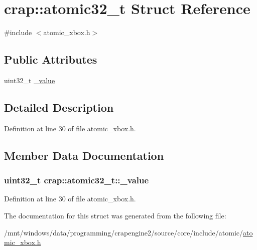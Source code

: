 \hypertarget{structcrap_1_1atomic32__t}{\section{crap\+:\+:atomic32\+\_\+t Struct Reference}
\label{structcrap_1_1atomic32__t}
}


{\ttfamily \#include $<$atomic\+\_\+xbox.\+h$>$}

\subsection*{Public Attributes}
\begin{DoxyCompactItemize}
\item 
uint32\+\_\+t \hyperlink{structcrap_1_1atomic32__t_abc3fe1e160a1f6e1337d38e326d3f3f1}{\+\_\+value}
\end{DoxyCompactItemize}


\subsection{Detailed Description}


Definition at line 30 of file atomic\+\_\+xbox.\+h.



\subsection{Member Data Documentation}
\hypertarget{structcrap_1_1atomic32__t_abc3fe1e160a1f6e1337d38e326d3f3f1}{
\subsubsection[{\+\_\+value}]{\setlength{\rightskip}{0pt plus 5cm}uint32\+\_\+t crap\+::atomic32\+\_\+t\+::\+\_\+value}}\label{structcrap_1_1atomic32__t_abc3fe1e160a1f6e1337d38e326d3f3f1}


Definition at line 30 of file atomic\+\_\+xbox.\+h.



The documentation for this struct was generated from the following file\+:\begin{DoxyCompactItemize}
\item 
/mnt/windows/data/programming/crapengine2/source/core/include/atomic/\hyperlink{atomic__xbox_8h}{atomic\+\_\+xbox.\+h}\end{DoxyCompactItemize}
